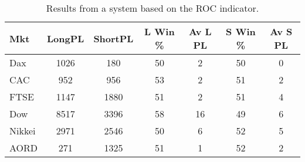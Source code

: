 \begin{table}[ht]
\centering
\caption[Results from a system based on the ROC indicator]{Results from a system based on the ROC indicator.} 
\label{tab:mac_roc_results}
\begin{tabular}{lcccccc}
  \toprule Mkt & LongPL & ShortPL & L Win \% & Av L PL & S Win \% & Av S PL \\ 
  \midrule Dax & 1026 & 180 & 50 & 2 & 50 & 0 \\ 
  CAC & 952 & 956 & 53 & 2 & 51 & 2 \\ 
  FTSE & 1147 & 1880 & 51 & 2 & 51 & 4 \\ 
  Dow & 8517 & 3396 & 58 & 16 & 49 & 6 \\ 
  Nikkei & 2971 & 2546 & 50 & 6 & 52 & 5 \\ 
  AORD & 271 & 1325 & 51 & 1 & 52 & 2 \\ 
   \bottomrule \end{tabular}
\end{table}
